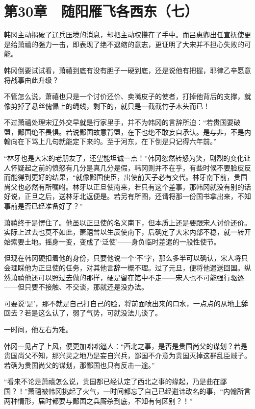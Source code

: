 \section{第30章　随阳雁飞各西东（七）}

韩冈主动揭破了辽兵压境的消息，却把主动权攥在了手中。而吕惠卿出任宣抚使更是给萧禧的强力一击，即表现了绝不退缩的意志，更证明了大宋并不担心失败的可能。

韩冈倒要试试看，萧禧到底有没有胆子一硬到底，还是说他有把握，耶律乙辛愿意将战事由此升级？

不管怎么说，萧禧也只是一个讨价还价、卖嘴皮子的使者，打掉他背后的支撑，就像剪掉了悬丝傀儡上的绳线，剩下的，就只是一截截竹子木头而已！

不过萧禧处理宋辽外交早就是行家里手，并不为韩冈的言辞所迫：“若贵国要破盟，鄙国绝不畏惧。若说鄙国故意背盟，在下也绝不敢妄自承认。是与非，不是内翰向在下骂上几句就能定下来的。至于河东，在下倒是只记得六年前。”

“林牙也是大宋的老朋友了，还望能坦诚一点！”韩冈忽然转怒为笑，剧烈的变化让人怀疑起之前的愤怒有几分是真几分是假，韩冈则并不在乎，有些时候不要脸皮反而能得到更好的结果，“就像鄙国使臣，出使前天子必有交代。林牙南下前，贵国尚父也必然有所嘱咐。林牙以正旦使南来，若只有这个差事，那韩冈就没有别的话好说，正旦之后，送林牙北返便是。若另有所图，还请将那一份国书拿出来，不知事前是否已经准备好了？”

萧禧终于是愣住了。他虽以正旦使的名义南下，但本质上还是要跟宋人讨价还价。实际上过去也莫不如此，萧禧曾以生辰使南下，后确定了大宋内部不稳，就一转开始索要土地。摇身一变，变成了‘泛使’——身负临时差遣的一般性使节。

但现在韩冈硬扣着他的身份，只要他说一个‘不’字，那么多半可以确认，宋人将只会理睬他为正旦使的任务，对其他言辞一概不理。过了元旦，便将他遣送回国。纵然萧禧他还可以照过去做的那样，硬是留在馆中不走——宋人也不可能强行驱逐——但只要不接触、不交谈，那就还是没办法。

可要说‘是’，那不就是自己打自己的脸，将前面喷出来的口水，一点点的从地上舔回去？若是这么认了，弱了气势，可就没法儿谈了。

一时间，他左右为难。

韩冈一见占了上风，便更加咄咄逼人：“西北之事，是否是贵国尚父的谋划？若是贵国尚父不知，那兴灵之地乃是妄自兴兵，鄙国不介意为贵国灭掉这群乱臣贼子。若确为贵国尚父的谋划，那鄙国也只有反击一途。”

“看来不论是萧禧怎么说，贵国都已经认定了西北之事的缘起，乃是曲在鄙国？！”萧禧被韩冈挑起了火气，一时间都忘了自己已经避讳改名的事，“内翰所言两种情形，届时都要与鄙国之兵厮杀到底，不知有何区别？！”

